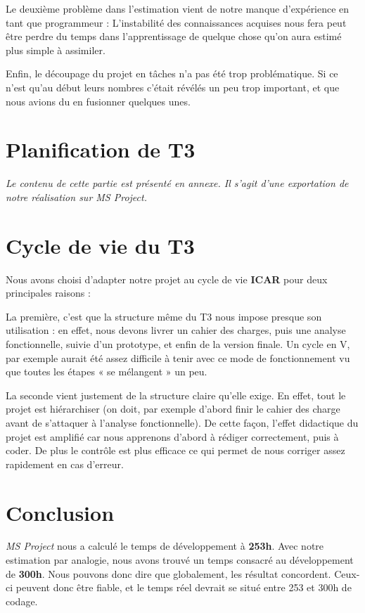\documentclass[etudiants]{support-iutrs}
\begin{document}
Le deuxième problème dans l'estimation vient de notre manque d'expérience en tant que programmeur :
L'instabilité des connaissances acquises nous fera peut être perdre du temps dans l'apprentissage de quelque chose qu'on aura estimé plus simple à assimiler. 

Enfin, le découpage du projet en tâches n'a pas été trop problématique. 
Si ce n'est qu'au début leurs nombres c'était révélés un peu trop important,
et que nous avions du en fusionner quelques unes. 

\section{Planification de T3}

\emph{Le contenu de cette partie est présenté en annexe.
	Il s'agit d'une exportation de notre réalisation sur \emph{MS Project}.}

\newpage{}
\section{Cycle de vie du T3}
Nous avons choisi d'adapter notre projet au cycle de vie \textbf{ICAR} pour deux principales raisons : 

La première, c'est que la structure même du T3 nous impose presque son utilisation :
en effet, nous devons livrer un cahier des charges, puis une analyse fonctionnelle, suivie d'un prototype, et enfin de la version finale. 
Un cycle en V, par exemple aurait été assez difficile à tenir avec ce mode de fonctionnement vu que toutes les étapes « se mélangent » un peu. 

La seconde vient justement de la structure claire qu'elle exige. 
En effet, tout le projet est hiérarchiser (on doit, par exemple d'abord finir le cahier des charge avant de s'attaquer à l'analyse fonctionnelle). 
De cette façon, l'effet didactique du projet est amplifié car nous apprenons d'abord à rédiger correctement, puis à coder. 
De plus le contrôle est plus efficace ce qui permet de nous corriger assez rapidement en cas d'erreur.

\section{Conclusion}
\emph{MS Project} nous a calculé le temps de développement à \textbf{253h}. 
Avec notre estimation par analogie, nous avons trouvé un temps consacré au développement de \textbf{300h}. 
Nous pouvons donc dire que globalement, les résultat concordent. 
Ceux-ci peuvent donc être fiable, et le temps réel devrait se situé entre 253 et 300h de codage. 
\end{document}
